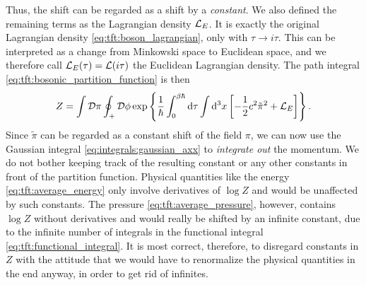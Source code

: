 Thus, the shift can be regarded as a shift by a \emph{constant}.
We also defined the remaining terms as the Lagrangian density $\mathcal{L}_E$.
It is exactly the original Lagrangian density \eqref{eq:tft:boson_lagrangian}, only with $\tau \rightarrow i \tau$.
This can be interpreted as a change from Minkowski space to Euclidean space, and we therefore call $\mathcal{L}_E(\tau) = \mathcal{L}(i \tau)$ the Euclidean Lagrangian density.
The path integral \eqref{eq:tft:bosonic_partition_function} is then
\begin{equation}
	Z = \int \mathcal{D} \pi \oint_+ \mathcal{D} \phi \exp \left\{ \frac{1}{\hbar} \int_0^{\beta \hbar} \mathop{}\!\mathrm{d} \tau \int \mathop{}\!\mathrm{d}^3 x \left[ - \frac12 c^2 \tilde\pi^2 + \mathcal{L}_E \right] \right\} .
\label{eq:tft:boson_integrate_out_momentum}
\end{equation}
Since $\tilde\pi$ can be regarded as a constant shift of the field $\pi$, we can now use the Gaussian integral \eqref{eq:integrals:gaussian_axx} to \emph{integrate out} the momentum. 
We do not bother keeping track of the resulting constant or any other constants in front of the partition function.
Physical quantities like the energy \eqref{eq:tft:average_energy} only involve derivatives of $\log Z$ and would be unaffected by such constants.
The pressure \eqref{eq:tft:average_pressure}, however, contains $\log Z$ without derivatives and would really be shifted by an infinite constant, due to the infinite number of integrals in the functional integral \eqref{eq:tft:functional_integral}.
It is most correct, therefore, to disregard constants in $Z$ with the attitude that we would have to renormalize the physical quantities in the end anyway, in order to get rid of infinites.

